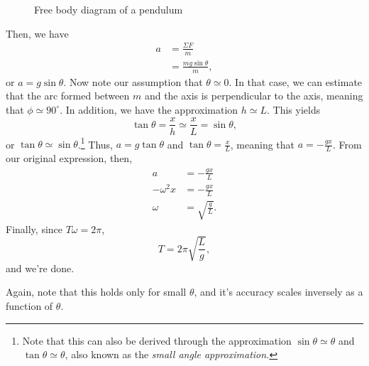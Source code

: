 \documentclass[11pt]{article}
\begin{document}
\begin{solution}
\begin{figure}[h!]
	\caption{Free body diagram of a pendulum}
\end{figure}

\noindent Then, we have
\begin{align*}
	a &= \frac{\Sigma F}{m} \\
	&= \frac{mg\sin\theta}{m},
\end{align*}
or $a = g\sin\theta$. Now note our assumption that $\theta \simeq 0$. In that case, we can estimate that the arc formed between $m$ and the axis is perpendicular to the axis, meaning that $\phi \simeq 90^{\circ}$. In addition, we have the approximation $h \simeq L$. This yields
\[\tan\theta = \frac{x}{h} \simeq \frac{x}{L} = \sin\theta,\]
or $\tan\theta \simeq \sin\theta$.\footnote{Note that this can also be derived through the approximation $\sin\theta \simeq \theta$ and $\tan\theta \simeq \theta$, also known as the \textit{small angle approximation.}} Thus, $a = g\tan\theta$ and $\tan\theta = \frac{x}{L}$, meaning that $a = -\frac{gx}{L}$. From our original expression, then,
\begin{align*}
	a &= -\frac{gx}{L} \\
	-\omega^2 x &= -\frac{gx}{L} \\
	\omega &= \sqrt{\frac{g}{L}}.
\end{align*}
Finally, since $T\omega = 2\pi$,
\[\boxed{T = 2\pi\sqrt{\frac{L}{g}}},\]
and we're done.
\end{solution}

Again, note that this holds only for small $\theta$, and it's accuracy scales inversely as a function of $\theta$.
\end{document}
